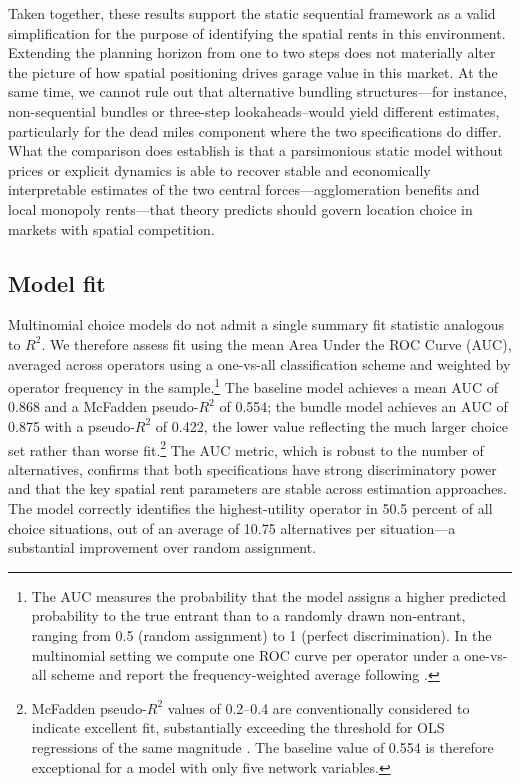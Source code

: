 \documentclass[12pt]{article}
\begin{document}
Taken together, these results support the static sequential framework as a valid 
simplification for the purpose of identifying the spatial rents in this environment. Extending the planning horizon from one to two steps does 
not materially alter the picture of how spatial positioning drives garage 
value in this market. At the same time, we cannot rule out that alternative 
bundling structures---for instance, non-sequential bundles or three-step 
lookaheads--would yield different estimates, particularly for the dead miles 
component where the two specifications do differ. What the comparison does 
establish is that a parsimonious static model without prices or explicit 
dynamics is able to recover stable and economically interpretable estimates 
of the two central forces---agglomeration benefits and local monopoly 
rents---that theory predicts should govern location choice in markets with 
spatial competition. 

\subsection{Model fit} 
Multinomial choice models do not admit a single summary fit statistic 
analogous to $R^2$. We therefore assess fit using the mean Area Under 
the ROC Curve (AUC), averaged across operators using a one-vs-all 
classification scheme and weighted by operator frequency in the 
sample.\footnote{The AUC measures the probability that the model assigns 
a higher predicted probability to the true entrant than to a randomly 
drawn non-entrant, ranging from 0.5 (random assignment) to 1 (perfect 
discrimination). In the multinomial setting we compute one ROC curve per 
operator under a one-vs-all scheme and report the frequency-weighted 
average following \cite{provost2003tree}.} The baseline model achieves 
a mean AUC of 0.868 and a McFadden pseudo-$R^2$ of 0.554; the bundle 
model achieves an AUC of 0.875 with a pseudo-$R^2$ of 0.422, the lower 
value reflecting the much larger choice set rather than worse 
fit.\footnote{McFadden pseudo-$R^2$ values of 0.2--0.4 are conventionally 
considered to indicate excellent fit, substantially exceeding the threshold 
for OLS regressions of the same magnitude \citep{domencich1975urban}. The 
baseline value of 0.554 is therefore exceptional for a model with only five 
network variables.} The AUC metric, which is robust to the number of 
alternatives, confirms that both specifications have strong discriminatory 
power and that the key spatial rent parameters are stable across estimation 
approaches. The model correctly identifies the highest-utility operator in 
50.5 percent of all choice situations, out of an average of 10.75 alternatives 
per situation---a substantial improvement over random assignment.
\end{document}
